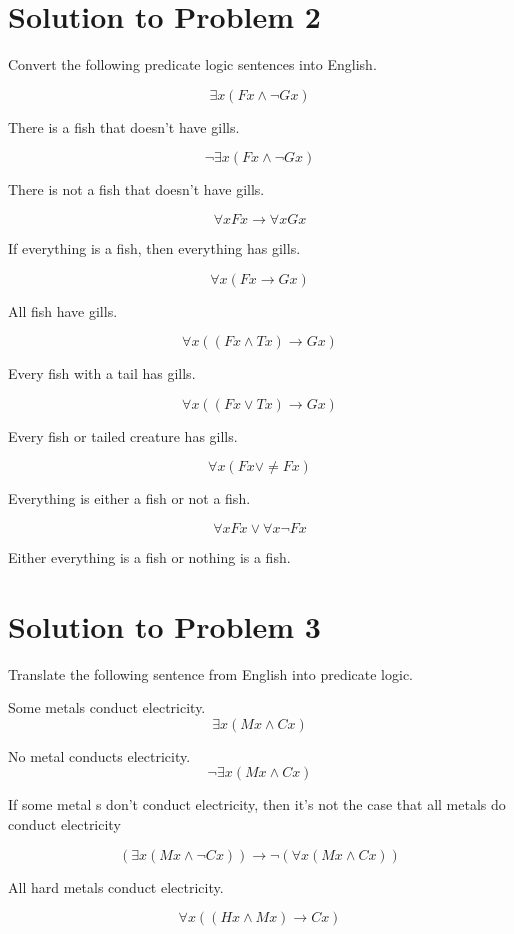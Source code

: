 \documentclass[12pt]{article}
\begin{document}
\section*{Solution to Problem 2}

Convert the following predicate logic sentences into English.

\[ \exists x (Fx \land \neg Gx) \]

There is a fish that doesn't have gills.

\[ \neg \exists x (Fx \land \neg Gx) \]

There is not a fish that doesn't have gills.

\[ \forall x Fx \rightarrow \forall x Gx \]

If everything is a fish, then everything has gills.

\[ \forall x (Fx \rightarrow Gx) \]

All fish have gills.

\[ \forall x ((Fx \land Tx) \rightarrow Gx) \]

Every fish with a tail has gills.

\[ \forall x ((Fx \lor Tx) \rightarrow Gx) \]

Every fish or tailed creature has gills.

\[ \forall x (Fx \lor \neq Fx) \]

Everything is either a fish or not a fish.

\[ \forall x Fx \lor \forall x \neg Fx \]

Either everything is a fish or nothing is a fish.


\section*{Solution to Problem 3}

Translate the following sentence from English into predicate logic. 

Some metals conduct electricity.
\[ \exists x (Mx \land Cx) \]

No metal conducts electricity.
\[ \neg \exists x (Mx \land Cx) \]

If some metal s don't conduct electricity, then it's not the case that all metals do conduct electricity

\[ (\exists x (Mx \land \neg Cx)) \rightarrow \neg (\forall x (Mx \land Cx)) \]

All hard metals conduct electricity.

\[ \forall x ((Hx \land Mx) \rightarrow Cx) \]
\end{document}
